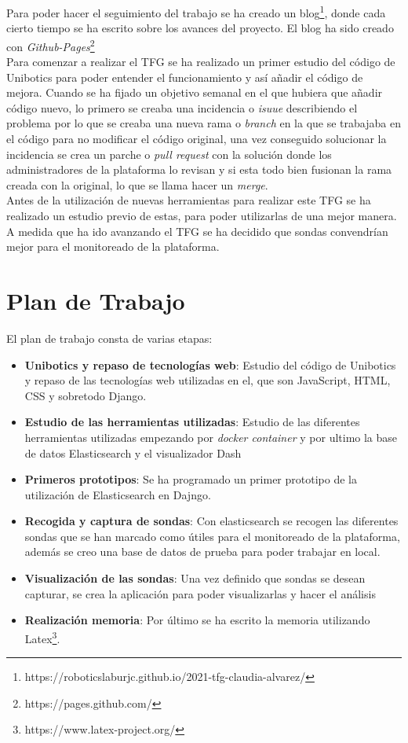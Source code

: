 Para poder hacer el seguimiento del trabajo se ha creado un blog\footnote{https://roboticslaburjc.github.io/2021-tfg-claudia-alvarez/}, donde cada cierto tiempo se ha escrito sobre los avances del proyecto. El blog ha sido creado con \textit{Github-Pages}\footnote{https://pages.github.com/}\\

Para comenzar a realizar el TFG se ha realizado un primer estudio del código de Unibotics para poder entender el funcionamiento y así añadir el código de mejora. Cuando se ha fijado un objetivo semanal en el que hubiera que añadir código nuevo, lo primero se creaba una incidencia o \textit{isuue} describiendo el problema por lo que se creaba una nueva rama o \textit{branch } en la que se trabajaba en el código para no modificar el código original, una vez conseguido solucionar la incidencia se crea un parche o \textit{pull request} con la solución donde los administradores de la plataforma lo revisan y si esta todo bien fusionan la rama creada con la original, lo que se llama hacer un \textit{merge}.\\

Antes de la utilización de nuevas herramientas para realizar este TFG se ha realizado un estudio previo de estas, para poder utilizarlas de una mejor manera. A medida que ha ido avanzando el TFG se ha decidido que sondas convendrían mejor para el monitoreado de la plataforma.

\newpage
\section{Plan de Trabajo}
El plan de trabajo consta de varias etapas:

\begin{itemize}
\item \textbf{Unibotics  y repaso de tecnologías web}: Estudio del código de Unibotics y repaso de las tecnologías web utilizadas en el, que son JavaScript, HTML, CSS y sobretodo Django.

\item \textbf{Estudio de las herramientas utilizadas}: Estudio de las diferentes herramientas utilizadas empezando por \textit{docker container} y por ultimo la base de datos Elasticsearch y el visualizador Dash

\item \textbf{Primeros prototipos}: Se ha programado un primer prototipo de la utilización de Elasticsearch en Dajngo.

\item \textbf{Recogida y captura de sondas}: Con elasticsearch se recogen las diferentes sondas que se han marcado como útiles para el monitoreado de la plataforma, además se creo una base de datos de prueba para poder trabajar en local.
\item \textbf{Visualización de las sondas}: Una vez definido que sondas se desean capturar, se crea la aplicación para poder visualizarlas y hacer el análisis
\item \textbf{Realización memoria}: Por último se ha escrito la memoria utilizando Latex\footnote{https://www.latex-project.org/}.
\end{itemize}

